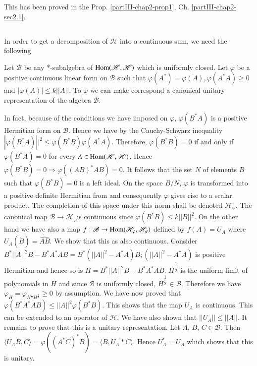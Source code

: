 This has been proved in the Prop. \ref{partIII-chap2-prop1},
Ch. \ref{partIII-chap2-sec2.1}. 

\subsection{}\label{partIII-chap2-sec2.2}

In order to get a decomposition of $\mathscr{H}$ into a continuous
sum, we need the following 

\begin{lemma*}
Let $\mathcal{B}$ be any *-subalgebra of $\operatorname{Hom} (\mathscr{H},
\mathscr{H})$ which 
is uniformly closed. Let $\varphi$ be a positive continuous linear
form on $\mathcal{B}$ such that $\varphi(A^*)= \overline{\varphi(A)},
\varphi(A^*A) \ge 0$  and  $| \varphi(A) | \le k || A ||$.  To
$\varphi$ we can make correspond a canonical unitary representation of
the algebra $\mathcal{B}$. 
\end{lemma*} 

In fact, because of the conditions we have imposed on $\varphi$,
$\varphi(B^*A)$ is a positive Hermitian form on $\mathscr{B}$. Hence we 
have by the Cauchy-Schwarz inequality $| \varphi(B^*A) ||^2 \le
\varphi(B^*B) \varphi(A^*A)$. Therefore, $\varphi(B^*B)=0$ if and only 
if $\varphi(B^*A)=0 $ for every $A \in \operatorname{Hom} (\mathscr{H}, \mathscr{H})$. Hence
$\varphi(B^* B)=0 \Rightarrow \varphi ((AB)^* AB)=0$. It follows that
the set $N$ of elements $B$ such that $\varphi (B^\ast B)=0$ is a left
ideal. On the space $B/N$, $\varphi$ is transformed into a positive
definite Hermitian from and consequently $\varphi$ gives rise to a
scalar product. The completion of this space under this norm shall be
denoted $\mathscr{H}_\varphi$. The canonical map
$\mathscr{B}\rightarrow \mathscr{H}_\varphi$\pageoriginale is
continuous since $\varphi(B^\ast 
B)\leq k|| B ||^2$. On the other hand we have also a map $f :
\mathscr{B} \rightarrow   \operatorname{Hom}
(\mathscr{H}_\varphi,\mathscr{H}_\varphi)$ defined by $f(A)= U_A$
where  $U_A(\dot{B})=\dot{\widehat{AB}}$. We show that this as also
continuous. Consider $B^\ast || A ||^2 B-B^\ast A^\ast AB=B^\ast(|| A
||^2 - A^\ast A) B; (|| A ||^2 - A^\ast A)$  is positive Hermitian and
hence so is $H =B^\ast || A ||^2 B-B^\ast A^\ast AB$. $H^{\dfrac{1}{2}}$
is the uniform limit of polynomials in $H$ and since $\mathscr{B}$ is
uniformly closed, $H^{\dfrac{1}{2}}\in \mathscr{B}$. 
Therefore we have $\varphi_H =
\varphi_{H^{\frac{1}{2}} H^{\frac{1}{2}}} \geq 0$ by assumption. We
have now proved that $\varphi(B^\ast A^\ast AB)\leq || A ||^2 \varphi
(B^\ast B)$. This shows that the map $U_A$ is continuous. This can be
extended to an operator of $\mathscr{H}$. We have also shown that $||
U_A || \leq || A ||$. It remains to prove that this is a unitary
representation. Let $A$, $B$, $C \in \mathscr{B}$. Then $\langle U_A
\dot{B},\dot{C}\rangle= \varphi((A^\ast C)^\ast B)=\langle \dot{B},U_A
\ast C \rangle$. Hence $U^\ast_A = U_A$ which shows that this is
unitary. 

